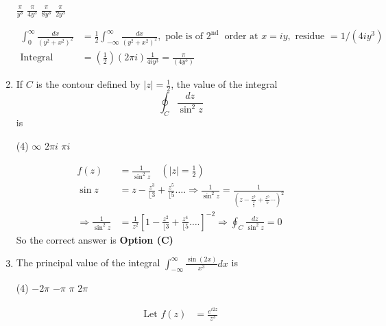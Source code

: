 \begin{note}
\begin{enumerate}[label=\color{ocre}\textbf{\arabic*.}]
\begin{tasks}
		\task[\textbf{A.}] $\frac{\pi}{y^{3}}$
		\task[\textbf{B.}] $\frac{\pi}{4 y^{3}}$
		\task[\textbf{C.}]  $\frac{\pi}{8 y^{3}}$
		\task[\textbf{D.}] $\frac{\pi}{2 y^{3}}$
	\end{tasks}
	\begin{answer}
		\begin{align*}
		\int_{0}^{\infty} \frac{d x}{\left(y^{2}+x^{2}\right)^{2}}&=\frac{1}{2} \int_{-\infty}^{\infty} \frac{d x}{\left(y^{2}+x^{2}\right)^{2}},\text{ pole is of }2^{\text {nd }}\text{ order at }x=i y,\text{ residue }=1 /\left(4 i y^{3}\right)\\
		\text{Integral }&=\left(\frac{1}{2}\right)(2 \pi i) \frac{1}{4 i y^{3}}=\frac{\pi}{\left(4 y^{3}\right)}
		\end{align*}
	\end{answer}
	\item If $C$ is the contour defined by $|z|=\frac{1}{2}$, the value of the integral
	$$
	\oint_{C} \frac{d z}{\sin ^{2} z}
	$$
	is
	{}
	\begin{tasks}(4)
		\task[\textbf{A.}] $\infty$
		\task[\textbf{B.}] $2 \pi i$
		\task[\textbf{D.}] $\pi i$
	\end{tasks}
	\begin{answer}
		\begin{align*}
		f(z)&=\frac{1}{\sin ^{2} z} \quad\left(|z|=\frac{1}{2}\right)\\
		\sin z&=z-\frac{z^{3}}{\lfloor 3}+\frac{z^{5}}{\lfloor 5} \ldots . \Rightarrow \frac{1}{\sin ^{2} z}=\frac{1}{\left(z-\frac{z^{3}}{\frac{3}{3}}+\frac{z^{5}}{5} \cdots\right)^{2}}\\
		\Rightarrow \frac{1}{\sin ^{2} z}&=\frac{1}{z^{2}}\left[1-\frac{z^{2}}{\lfloor 3}+\frac{z^{4}}{\lfloor 5} \ldots .\right]^{-2} \Rightarrow \oint_{C} \frac{d z}{\sin ^{2} z}=0
		\end{align*}
		So the correct answer is \textbf{Option (C)}
	\end{answer}
	\item The principal value of the integral $\int_{-\infty}^{\infty} \frac{\sin (2 x)}{x^{3}} d x$ is
	{}
	\begin{tasks}(4)
		\task[\textbf{A.}] $-2 \pi$
		\task[\textbf{B.}]  $-\pi$
		\task[\textbf{C.}] $\pi$
		\task[\textbf{D.}]  $2 \pi$
	\end{tasks}
	\begin{answer}
		\begin{align*}
		\text{Let }f(z)&=\frac{e^{i 2 z}}{z^{3}}\\

\end{align*}
\end{answer}
\end{enumerate}
\end{note}

